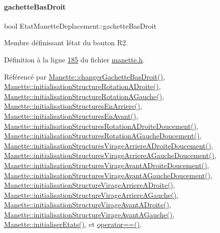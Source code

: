 \paragraph{\texorpdfstring{gachette\+Bas\+Droit}{gachetteBasDroit}}
{\footnotesize\ttfamily bool Etat\+Manette\+Deplacement\+::gachette\+Bas\+Droit}



Membre définissant l\textquotesingle{}état du bouton R2. 



Définition à la ligne \hyperlink{manette_8h_source_l00185}{185} du fichier \hyperlink{manette_8h_source}{manette.\+h}.



Référencé par \hyperlink{manette_8cpp_source_l00504}{Manette\+::changer\+Gachette\+Bas\+Droit()}, \hyperlink{manette_8cpp_source_l00178}{Manette\+::initialisation\+Structure\+Rotation\+A\+Droite()}, \hyperlink{manette_8cpp_source_l00151}{Manette\+::initialisation\+Structure\+Rotation\+A\+Gauche()}, \hyperlink{manette_8cpp_source_l00127}{Manette\+::initialisation\+Structures\+En\+Arriere()}, \hyperlink{manette_8cpp_source_l00103}{Manette\+::initialisation\+Structures\+En\+Avant()}, \hyperlink{manette_8cpp_source_l00188}{Manette\+::initialisation\+Structures\+Rotation\+A\+Droite\+Doucement()}, \hyperlink{manette_8cpp_source_l00161}{Manette\+::initialisation\+Structures\+Rotation\+A\+Gauche\+Doucement()}, \hyperlink{manette_8cpp_source_l00296}{Manette\+::initialisation\+Structures\+Virage\+Arriere\+A\+Droite\+Doucement()}, \hyperlink{manette_8cpp_source_l00269}{Manette\+::initialisation\+Structures\+Virage\+Arriere\+A\+Gauche\+Doucement()}, \hyperlink{manette_8cpp_source_l00242}{Manette\+::initialisation\+Structures\+Virage\+Avant\+A\+Droite\+Doucement()}, \hyperlink{manette_8cpp_source_l00215}{Manette\+::initialisation\+Structures\+Virage\+Avant\+A\+Gauche\+Doucement()}, \hyperlink{manette_8cpp_source_l00286}{Manette\+::initialisation\+Structure\+Virage\+Arriere\+A\+Droite()}, \hyperlink{manette_8cpp_source_l00259}{Manette\+::initialisation\+Structure\+Virage\+Arriere\+A\+Gauche()}, \hyperlink{manette_8cpp_source_l00232}{Manette\+::initialisation\+Structure\+Virage\+Avant\+A\+Droite()}, \hyperlink{manette_8cpp_source_l00205}{Manette\+::initialisation\+Structure\+Virage\+Avant\+A\+Gauche()}, \hyperlink{manette_8cpp_source_l00023}{Manette\+::initialiser\+Etats()}, et \hyperlink{manette_8cpp_source_l00636}{operator==()}.

\mbox{\label{struct_etat_manette_deplacement_a0d197e25bc2e0402a068a8d012c25472}} 
